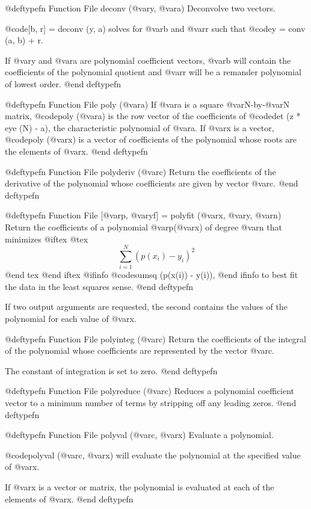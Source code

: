 @deftypefn {Function File} {} deconv (@var{y}, @var{a})
Deconvolve two vectors.

@code{[b, r] = deconv (y, a)} solves for @var{b} and @var{r} such that
@code{y = conv (a, b) + r}.

If @var{y} and @var{a} are polynomial coefficient vectors, @var{b} will
contain the coefficients of the polynomial quotient and @var{r} will be
a remander polynomial of lowest order.
@end deftypefn

@deftypefn {Function File} {} poly (@var{a})
If @var{a} is a square @var{N}-by-@var{N} matrix, @code{poly (@var{a})}
is the row vector of the coefficients of @code{det (z * eye (N) - a)},
the characteristic polynomial of @var{a}.  If @var{x} is a vector,
@code{poly (@var{x})} is a vector of coefficients of the polynomial
whose roots are the elements of @var{x}.
@end deftypefn

@deftypefn {Function File} {} polyderiv (@var{c})
Return the coefficients of the derivative of the polynomial whose
coefficients are given by vector @var{c}.
@end deftypefn

@deftypefn {Function File} {[@var{p}, @var{yf}] =} polyfit (@var{x}, @var{y}, @var{n})
Return the coefficients of a polynomial @var{p}(@var{x}) of degree
@var{n} that minimizes 
@iftex
@tex
$$
\sum_{i=1}^N (p(x_i) - y_i)^2
$$
@end tex
@end iftex
@ifinfo
@code{sumsq (p(x(i)) - y(i))},
@end ifinfo
 to best fit the data in the least squares sense.
@end deftypefn

If two output arguments are requested, the second contains the values of
the polynomial for each value of @var{x}.

@deftypefn {Function File} {} polyinteg (@var{c})
Return the coefficients of the integral of the polynomial whose
coefficients are represented by the vector @var{c}.

The constant of integration is set to zero.
@end deftypefn

@deftypefn {Function File} {} polyreduce (@var{c})
Reduces a polynomial coefficient vector to a minimum number of terms by
stripping off any leading zeros.
@end deftypefn

@deftypefn {Function File} {} polyval (@var{c}, @var{x})
Evaluate a polynomial.

@code{polyval (@var{c}, @var{x})} will evaluate the polynomial at the
specified value of @var{x}.

If @var{x} is a vector or matrix, the polynomial is evaluated at each of
the elements of @var{x}.
@end deftypefn

